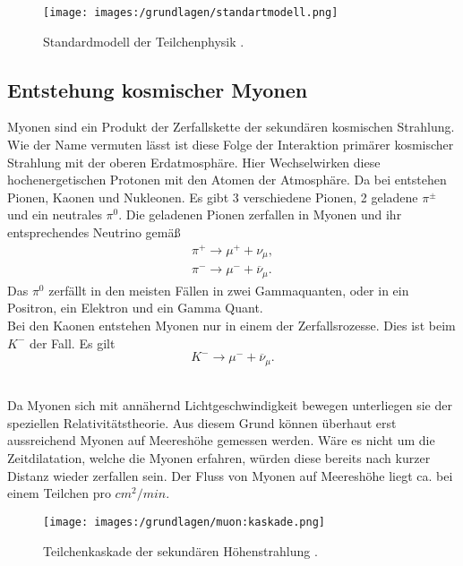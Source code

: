 \begin{figure}[H]
    \centering
    \texttt{[image: images:/grundlagen/standartmodell.png]}
    \caption{ Standardmodell der Teilchenphysik   \cite{standardmodell}.}
    \label{fig:standartmodell}
\end{figure}




\subsection{Entstehung kosmischer Myonen} \label{myon_entstehung}
Myonen sind ein Produkt der Zerfallskette der sekundären kosmischen Strahlung. Wie der Name vermuten lässt ist diese Folge der Interaktion primärer kosmischer Strahlung mit der oberen Erdatmosphäre.
Hier Wechselwirken diese hochenergetischen Protonen mit den Atomen der Atmosphäre.
Da bei entstehen Pionen, Kaonen und Nukleonen. 
Es gibt 3 verschiedene Pionen, 2 geladene $\pi^{\pm}$ und ein neutrales $\pi^0$. 
Die geladenen Pionen zerfallen in Myonen und ihr entsprechendes Neutrino gemäß 
\begin{align}
    \pi^+ \rightarrow  \mu^+ + \nu_{\mu},\\
    \pi^- \rightarrow  \mu^- + \overline{\nu}_{\mu}.
\end{align} 
Das $\pi^0$ zerfällt in den meisten Fällen in zwei Gammaquanten, oder in ein Positron, ein Elektron und ein Gamma Quant.\\
Bei den Kaonen entstehen Myonen nur in einem der Zerfallsrozesse.
Dies ist beim $K^-$ der Fall.
Es gilt 
\begin{equation}
    K^- \rightarrow \mu^- + \overline{\nu}_{\mu}.
\end{equation}
\\
\newline

Da Myonen sich mit annähernd Lichtgeschwindigkeit bewegen unterliegen sie der speziellen Relativitätstheorie. 
Aus diesem Grund können überhaut erst aussreichend Myonen auf Meereshöhe gemessen werden. 
Wäre es nicht um die Zeitdilatation, welche die Myonen erfahren, würden diese bereits nach kurzer Distanz wieder zerfallen sein. %
Der Fluss von Myonen auf Meereshöhe liegt ca. bei einem Teilchen pro $cm^2/min$. %


\begin{figure}[H]
    \centering
    \texttt{[image: images:/grundlagen/muon:kaskade.png]}
    \caption{ Teilchenkaskade der sekundären Höhenstrahlung   \cite{zhang2020muography}.}
    \label{fig:höhen_strahlung}
\end{figure}




